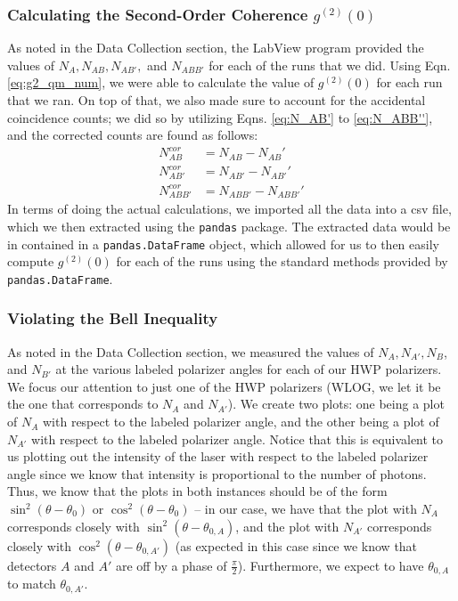 \documentclass[twocolumn,amsmath,amssymb,pra]{revtex4-2}
\begin{document}
\subsubsection{Calculating the Second-Order Coherence $g^{(2)}(0)$}
As noted in the Data Collection section, the LabView program provided the values of $N_{A}, N_{AB}, N_{AB'},$ and $N_{ABB'}$ for each of the runs that we did. Using Eqn. \ref{eq:g2_qm_num}, we were able to calculate the value of $g^{(2)}(0)$ for each run that we ran. On top of that, we also made sure to account for the accidental coincidence counts; we did so by utilizing Eqns. \ref{eq:N_AB'} to \ref{eq:N_ABB''}, and the corrected counts are found as follows: 
\begin{equation}
    \begin{aligned}
        N_{AB}^{cor}
        &= 
        N_{AB} - N_{AB}'
        \\[2mm]
        N_{AB'}^{cor}
        &= 
        N_{AB'} - N_{AB'}'
        \\[2mm]
        N_{ABB'}^{cor}
        &= 
        N_{ABB'} - N_{ABB'}'
    \end{aligned}
\end{equation}
In terms of doing the actual calculations, we imported all the data into a csv file, which we then extracted using the \texttt{pandas} package. The extracted data would be in contained in a \texttt{pandas.DataFrame} object, which allowed for us to then easily compute $g^{(2)}(0)$ for each of the runs using the standard methods provided by \texttt{pandas.DataFrame}.

\subsubsection{Violating the Bell Inequality}
As noted in the Data Collection section, we measured the values of $N_{A}, N_{A'}, N_{B}$, and $N_{B'}$ at the various labeled polarizer angles for each of our HWP polarizers. We focus our attention to just one of the HWP polarizers (WLOG, we let it be the one that corresponds to $N_{A}$ and $N_{A'}$). We create two plots: one being a plot of $N_{A}$ with respect to the labeled polarizer angle, and the other being a plot of $N_{A'}$ with respect to the labeled polarizer angle. Notice that this is equivalent to us plotting out the intensity of the laser with respect to the labeled polarizer angle since we know that intensity is proportional to the number of photons. Thus, we know that the plots in both instances should be of the form $\sin^{2}(\theta - \theta_{0})$ or $\cos^{2}(\theta - \theta_{0})$ -- in our case, we have that the plot with $N_{A}$ corresponds closely with $\sin^{2}(\theta - \theta_{0, A})$, and the plot with $N_{A'}$ corresponds closely with $\cos^{2}(\theta - \theta_{0, A'})$ (as expected in this case since we know that detectors $A$ and $A'$ are off by a phase of $\frac{\pi}{2}$). Furthermore, we expect to have $\theta_{0, A}$ to match $\theta_{0, A'}$. 
\end{document}
